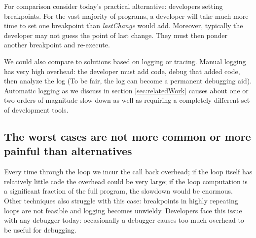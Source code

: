 \documentclass{sig-alternate}
\begin{document}

For comparison consider today's practical alternative: developers
setting breakpoints. For the vast majority of programs, a developer
will take much more time to set one breakpoint than
\textit{lastChange} would add. Moreover, typically the developer may not
guess the point of last change. They must then ponder another
breakpoint and re-execute. 


We could also compare to solutions based on logging or tracing. Manual
logging has very high overhead: the developer must add code, debug
that added code, then analyze the log (To be fair, the log can become
a permanent debugging aid). Automatic logging as we discuss in 
section \ref{sec:relatedWork} causes about one or two orders of magnitude slow down as well
as requiring a completely different set of development tools. 

\subsection{The worst cases are not more common or more painful than alternatives}

Every time through the loop we incur
the call back overhead; if the loop itself has relatively little code
the overhead could be very large; if the loop computation is a
significant fraction of the full program, the slowdown would be
enormous. 
Other techniques also struggle with this case:  breakpoints in highly repeating loops are not feasible and logging
becomes unwieldy. 
Developers face this issue with any debugger today: occasionally a
debugger causes too much overhead to be useful for debugging. 
%
\end{document}
